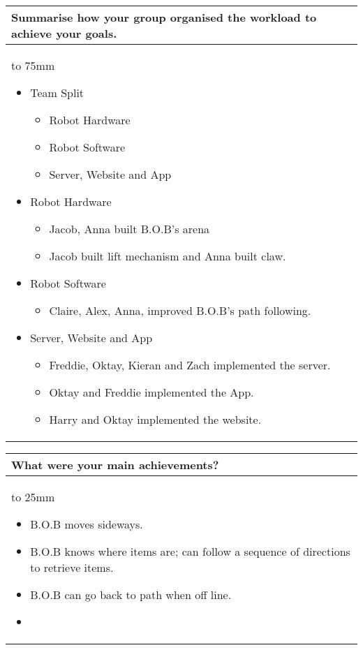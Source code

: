 \documentclass[a4paper]{article}
\newcommand{\colWidth}{141mm}
\begin{document}
\begin{center}
\begin{tabular}{|p{\colWidth}|}
	\hline
	\cellcolor{blue!25}\large
	\textbf{Summarise how your group organised the workload to achieve your goals.}
	\\ \hline
	\vtop to 75mm{
	\begin{itemize}
	    \item Team Split
	    \begin{itemize}
	        \item Robot Hardware
	        \item Robot Software
	        \item Server, Website and App 
	    \end{itemize}
	    \item Robot Hardware
	    \begin{itemize}
	        \item Jacob, Anna built B.O.B's arena
	        \item Jacob built lift mechanism and Anna built claw.
	    \end{itemize}
	    \item Robot Software
	    \begin{itemize}
	        \item Claire, Alex, Anna, improved B.O.B's path following.
	    \end{itemize}
	    \item Server, Website and App 
	    \begin{itemize}
	        \item Freddie, Oktay, Kieran and Zach implemented the server.
	        \item Oktay and Freddie implemented the App.
	        \item Harry and Oktay implemented the website.
	    \end{itemize}
	\end{itemize}
  }
  \\
  \hline
\end{tabular}
\vskip 5mm


\begin{tabular}{|p{\colWidth}|}
	\hline
	\cellcolor{blue!25}\large
	\textbf{What were your main achievements?}
	\\ \hline
	\vtop to 25mm{
	\begin{itemize}
	    \item B.O.B moves sideways.
	    \item B.O.B knows where items are; can follow a sequence of directions to retrieve items.
	    \item B.O.B can go back to path when off line.
	    \item 
	\end{itemize}
  }
  \\
  \hline
\end{tabular}
\vskip 5mm


\end{center}
\end{document}
